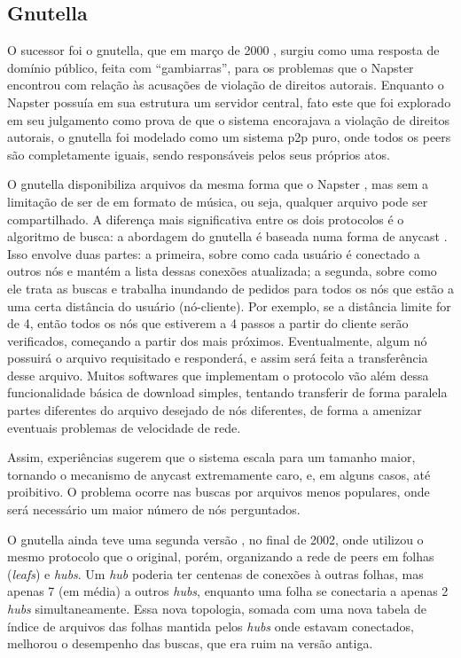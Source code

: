 \subsection*{Gnutella}

O sucessor foi o \gls{gnutella}, que em março de 2000 \cite{wiki:gnutella}, surgiu como
uma resposta de domínio público, feita com ``gambiarras'', para os problemas que o
Napster encontrou com relação às acusações de violação de direitos autorais. Enquanto o
Napster possuía em sua estrutura um servidor central, fato este que foi explorado em
seu julgamento como prova de que o sistema encorajava a violação de direitos autorais,
o \gls*{gnutella} foi modelado como um sistema \gls*{p2p} puro, onde todos os
\glspl*{peer} são completamente iguais, sendo responsáveis pelos seus próprios atos.

O \gls*{gnutella} disponibiliza arquivos da mesma forma que o Napster \cite{book:birman}
, mas sem a limitação de ser de em formato de música, ou seja, qualquer arquivo pode
ser compartilhado. A diferença mais significativa entre os dois protocolos é o
algoritmo de busca: a abordagem do \gls*{gnutella} é baseada numa forma de \gls{anycast}
. Isso envolve duas partes: a primeira, sobre como cada usuário é conectado a outros
nós e mantém a lista dessas conexões atualizada; a segunda, sobre como ele trata as
buscas e trabalha inundando de pedidos para todos os nós que estão a uma certa
distância do usuário (nó-cliente). Por exemplo, se a distância limite for de 4, então
todos os nós que estiverem a 4 passos a partir do cliente serão verificados, começando
a partir dos mais próximos. Eventualmente, algum nó possuirá o arquivo requisitado e
responderá, e assim será feita a transferência desse arquivo. Muitos softwares que
implementam o protocolo vão além dessa funcionalidade básica de download simples,
tentando transferir de forma paralela partes diferentes do arquivo desejado de nós
diferentes, de forma a amenizar eventuais problemas de velocidade de rede.

Assim, experiências sugerem que o sistema escala para um tamanho maior, tornando o
mecanismo de \gls*{anycast} extremamente caro, e, em alguns casos, até proibitivo. O
problema ocorre nas buscas por arquivos menos populares, onde será necessário um maior
número de nós perguntados.

O \gls*{gnutella} ainda teve uma segunda versão \cite{wiki:gnutella2}, no final de 2002,
onde utilizou o mesmo protocolo que o original, porém, organizando a rede de
\glspl*{peer} em folhas (\emph{leafs}) e \emph{hubs}. Um \emph{hub} poderia
ter centenas de conexões à outras folhas, mas apenas 7 (em média) a outros \emph{hubs},
enquanto uma folha se conectaria a apenas 2 \emph{hubs} simultaneamente. Essa nova
topologia, somada com uma nova tabela de índice de arquivos das folhas mantida pelos
\emph{hubs} onde estavam conectados, melhorou o desempenho das buscas, que era ruim na versão antiga.

